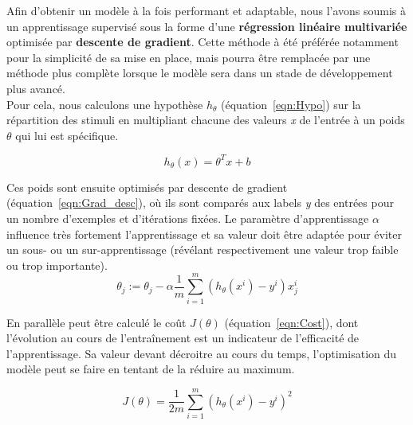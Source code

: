 Afin d'obtenir un modèle à la fois performant et adaptable, nous l'avons soumis à un apprentissage supervisé sous la forme d'une \textbf{régression linéaire multivariée} optimisée par \textbf{descente de gradient}. Cette méthode à été préférée notamment pour la simplicité de sa mise en place, mais pourra être remplacée par une méthode plus complète lorsque le modèle sera dans un stade de développement plus avancé.\\
Pour cela, nous calculons une hypothèse $h_{\theta}$ (équation~\ref{eqn:Hypo}) sur la répartition des stimuli en multipliant chacune des valeurs \textit{x} de l'entrée à un poids $\theta$ qui lui est spécifique.

\begin{equation}
h_{\theta}(x) = \theta^{T}x + b
\label{eqn:Hypo}
\end{equation}

Ces poids sont ensuite optimisés par descente de gradient (équation~\ref{eqn:Grad_desc}), où ils sont comparés aux labels \textit{y} des entrées pour un nombre d'exemples et d'itérations fixées. Le paramètre d'apprentissage $\alpha$ influence très fortement l'apprentissage et sa valeur doit être adaptée pour éviter un sous- ou un sur-apprentissage (révélant respectivement une valeur trop faible ou trop importante).\\

\begin{equation}
\theta_j := \theta_j - \alpha \frac{1}{m} \sum_{i=1}^m (h_\theta(x^i) - y^i)x_{j}^i
\label{eqn:Grad_desc}
\end{equation}

En parallèle peut être calculé le coût $J(\theta)$ (équation~\ref{eqn:Cost}), dont l'évolution au cours de l'entraînement est un indicateur de l'efficacité de l'apprentissage. Sa valeur devant décroitre au cours du temps, l'optimisation du modèle peut se faire en tentant de la réduire au maximum.

\begin{equation}
J(\theta) = \frac{1}{2m} \sum_{i=1}^m (h_\theta(x^i)-y^i)^2
\label{eqn:Cost}
\end{equation}